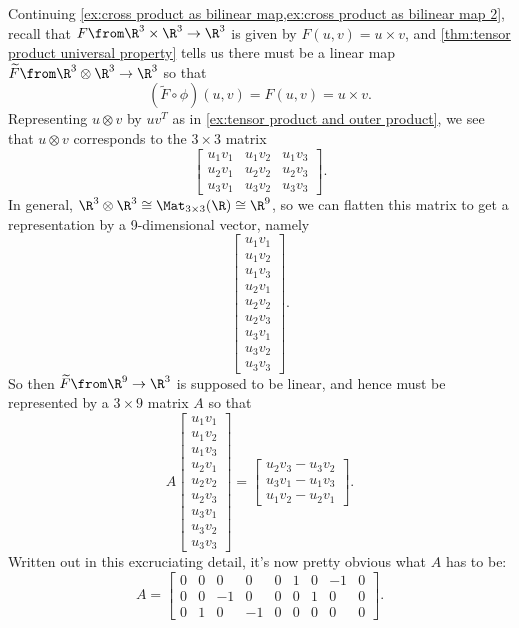 \begin{example}
	Continuing \cref{ex:cross product as bilinear map,ex:cross product as bilinear map 2}, recall that $F\from \R^3 \times \R^3 \to \R^3$ is given by $F(u,v) = u \times v$, and \cref{thm:tensor product universal property} tells us there must be a linear map $\widetilde{F}\from \R^3 \otimes \R^3 \to \R^3$ so that
	\[
		(\widetilde{F} \circ \phi)(u,v) = F(u,v) = u \times v.
	\]
	Representing $u \otimes v$ by $u v^T$ as in \cref{ex:tensor product and outer product}, we see that $u \otimes v$ corresponds to the $3 \times 3$ matrix 
	\[
		\begin{bmatrix}  u_1 v_1 & u_1 v_2 & u_1 v_3 \\
 u_2 v_1 & u_2 v_2 & u_2 v_3 \\
 u_3 v_1 & u_3 v_2 & u_3 v_3 \end{bmatrix}.
	\]
	In general, $\R^3 \otimes \R^3 \cong \Mat_{3 \times 3}(\R) \cong \R^9$, so we can flatten this matrix to get a representation by a 9-dimensional vector, namely
	\[
		\begin{bmatrix}u_1 v_1 \\
 u_1 v_2 \\
 u_1 v_3 \\
 u_2 v_1 \\
 u_2 v_2 \\
 u_2 v_3 \\
 u_3 v_1 \\
 u_3 v_2 \\
 u_3 v_3\end{bmatrix}.
	\]
	So then $\widetilde{F}\from \R^9 \to \R^3$ is supposed to be linear, and hence must be represented by a $3 \times 9$ matrix $A$ so that
	\[
		A \begin{bmatrix}u_1 v_1 \\
 u_1 v_2 \\
 u_1 v_3 \\
 u_2 v_1 \\
 u_2 v_2 \\
 u_2 v_3 \\
 u_3 v_1 \\
 u_3 v_2 \\
 u_3 v_3\end{bmatrix}  = \begin{bmatrix} u_2 v_3 - u_3 v_2 \\ u_3 v_1 - u_1 v_3 \\ u_1 v_2 - u_2 v_1 \end{bmatrix}.
	\]
	Written out in this excruciating detail, it's now pretty obvious what $A$ has to be:
	\[
		A = \begin{bmatrix} 0 & 0 & 0 & 0 & 0 & 1 & 0 & -1 & 0 \\ 0 & 0 & -1 & 0 & 0 & 0 & 1 & 0 & 0 \\ 0 & 1 & 0 & -1 & 0 & 0 & 0 & 0 & 0 \end{bmatrix}.
	\]
\end{example}